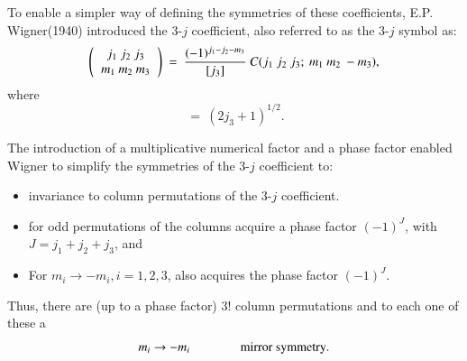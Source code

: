 To enable a simpler way of defining the symmetries of these coefficients, E.P. Wigner(1940) introduced the 3-$j$ coefficient, also referred to as the 3-$j$ symbol as:
\begin{equation}
\left(
\begin{tabular}{ccc}
$j_1\ j_2\ j_3$ \\ $m_1\ m_2\ m_3$ \\ 
\end{tabular} 
\right) 
\ = \ \frac{(-1)^{j_1-j_2-m_3}}{[j_3]}\ C(j_1\ j_2\ j_3;\ m_1\ m_2\ -m_3), \label{chap7-eq7}
\end{equation}
where
\begin{equation}
[j_3]\ =\ (2j_3 + 1)^{1/2}.\label{chap7-eq8}
\end{equation}

The introduction of a multiplicative numerical factor and a phase factor enabled Wigner to simplify the symmetries of the 3-$j$ coefficient to:
\begin{itemize}
\item invariance to column permutations of the 3-$j$ coefficient.
\item for odd permutations of the columns acquire a phase factor $(-1)^J$, with $J=j_1+j_2+j_3$, and 
\item For $m_i \rightarrow -m_i, i=1,2,3$,  also acquires the phase factor $(-1)^J$.
\end{itemize}

Thus, there are (up to a phase factor) 3! column permutations and to each one of these a 
\begin{equation}
m_i \rightarrow -m_i \qquad \qquad {\rm mirror\ symmetry}.\label{chap7-eq9}
\end{equation}

